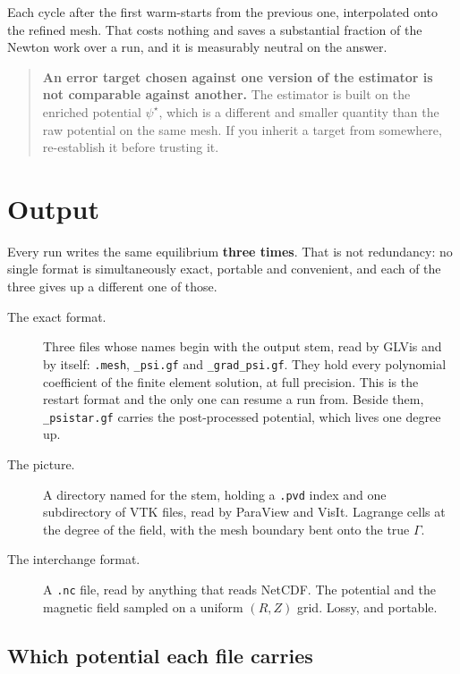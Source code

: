 Each cycle after the first warm-starts from the previous one, interpolated onto
the refined mesh. That costs nothing and saves a substantial fraction of the
Newton work over a run, and it is measurably neutral on the answer.

\begin{quote}
	\textbf{An error target chosen against one version of the estimator is not
	comparable against another.} The estimator is built on the enriched
	potential $\psi^{\star}$, which is a different and smaller quantity than the
	raw potential on the same mesh. If you inherit a target from somewhere,
	re-establish it before trusting it.
\end{quote}

\section{Output}
\label{sec:output}

Every run writes the same equilibrium \textbf{three times}. That is not
redundancy: no single format is simultaneously exact, portable and convenient,
and each of the three gives up a different one of those.

\begin{description}

\item[The exact format.] Three files whose names begin with the output
	stem, read by GLVis and by {\meq} itself:
	\texttt{.mesh}, \texttt{\_psi.gf} and \texttt{\_grad\_psi.gf}. They
	hold every polynomial coefficient of the finite element solution, at full
	precision. This is the restart format and the only one {\meq} can resume a
	run from. Beside them, \texttt{\_psistar.gf} carries the post-processed
	potential, which lives one degree up.

\item[The picture.] A directory named for the stem, holding a
	\texttt{.pvd} index and one subdirectory of VTK files, read by ParaView
	and VisIt.
	Lagrange cells at the degree of the field, with the mesh boundary bent onto
	the true $\Gamma$.

\item[The interchange format.] A \texttt{.nc} file, read by anything that
	reads NetCDF. The potential and the magnetic field sampled on a uniform $(R, Z)$
	grid. Lossy, and portable.

\end{description}

\subsection{Which potential each file carries}

